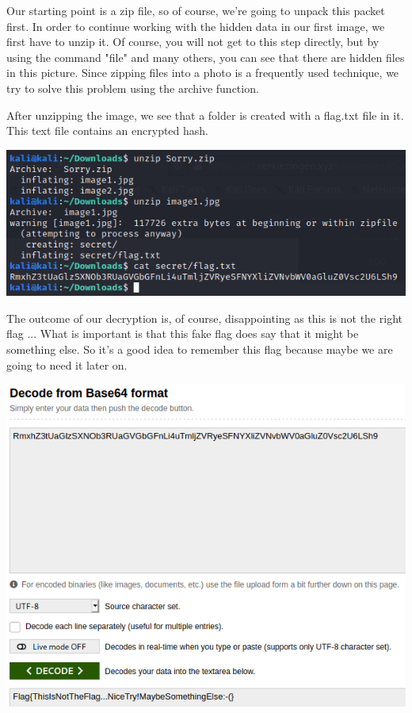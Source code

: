 \documentclass[../main.tex]{subfiles}
\begin{document}
Our starting point is a zip file, so of course, we're going to unpack this packet first. In order to continue working with the hidden data in our first image, we first have to unzip it. Of course, you will not get to this step directly, but by using the command "file" and many others, you can see that there are hidden files in this picture. Since zipping files into a photo is a frequently used technique, we try to solve this problem using the archive function. 

After unzipping the image, we see that a folder is created with a flag.txt file in it. This text file contains an encrypted hash.
\begin{center}
    \includegraphics[width=1\linewidth]{images/Robbe/sorry_writeup3.png}
\end{center}

\pagebreak
The outcome of our decryption is, of course, disappointing as this is not the right flag ... What is important is that this fake flag does say that it might be something else. So it's a good idea to remember this flag because maybe we are going to need it later on.
\begin{center}
    \includegraphics[width=0.8\linewidth]{images/Robbe/sorry_writeup4.png}
\end{center}
\end{document}
